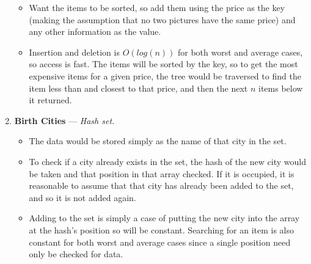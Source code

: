 \documentclass[11pt]{article} %
\begin{document}
\begin{enumerate}
		\begin{itemize}
			\item Want the items to be sorted, so add them using the price as
			the key (making the assumption that no two pictures have the same
			price) and any other information as the value.
			\item Insertion and deletion is $O\left(log(n)\right)$ for both
			worst and average cases, so access is fast. The items will be
			sorted by the key, so to get the most expensive items for a given
			price, the tree would be traversed to find the item less than and
			closest to that price, and then the next $n$ items below it
			returned.
		\end{itemize}

	\item \textbf{Birth Cities} --- \textit{Hash set.}

		\begin{itemize}
			\item The data would be stored simply as the name of that city in
			the set.
			\item To check if a city already exists in the set, the hash of the
			new city would be taken and that position in that array checked. If
			it is occupied, it is reasonable to assume that that city has
			already been added to the set, and so it is not added again.
			\item Adding to the set is simply a case of putting the new city
			into the array at the hash's position so will be constant. Searching
			for an item is also constant for both worst and average cases since
			a single position need only be checked for data.
		\end{itemize}

\end{enumerate}
\end{document}
